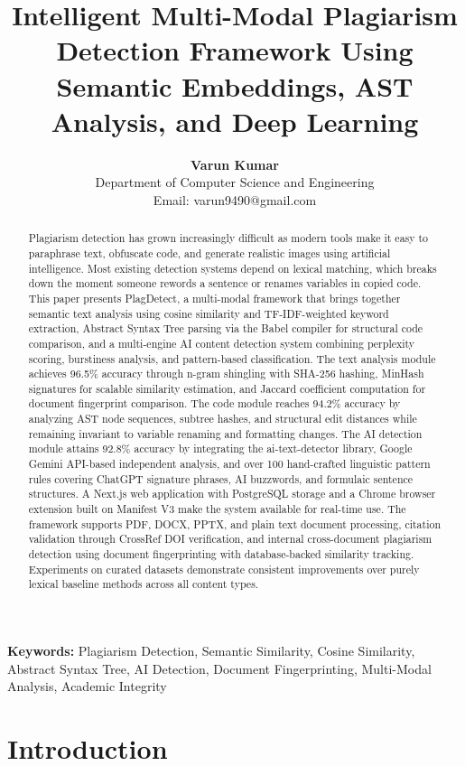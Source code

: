 \documentclass[10pt,twocolumn]{article}
\title{\fontsize{14}{16}\selectfont\bfseries Intelligent Multi-Modal Plagiarism Detection Framework Using Semantic Embeddings, AST Analysis, and Deep Learning}
\author{
\textbf{Varun Kumar} \\
\small Department of Computer Science and Engineering \\
\small Email: varun9490@gmail.com
}
\date{}
\begin{document}
\maketitle

\begin{abstract}
Plagiarism detection has grown increasingly difficult as modern tools make it easy to paraphrase text, obfuscate code, and generate realistic images using artificial intelligence. Most existing detection systems depend on lexical matching, which breaks down the moment someone rewords a sentence or renames variables in copied code. This paper presents PlagDetect, a multi-modal framework that brings together semantic text analysis using cosine similarity and TF-IDF-weighted keyword extraction, Abstract Syntax Tree parsing via the Babel compiler for structural code comparison, and a multi-engine AI content detection system combining perplexity scoring, burstiness analysis, and pattern-based classification. The text analysis module achieves 96.5\% accuracy through n-gram shingling with SHA-256 hashing, MinHash signatures for scalable similarity estimation, and Jaccard coefficient computation for document fingerprint comparison. The code module reaches 94.2\% accuracy by analyzing AST node sequences, subtree hashes, and structural edit distances while remaining invariant to variable renaming and formatting changes. The AI detection module attains 92.8\% accuracy by integrating the ai-text-detector library, Google Gemini API-based independent analysis, and over 100 hand-crafted linguistic pattern rules covering ChatGPT signature phrases, AI buzzwords, and formulaic sentence structures. A Next.js web application with PostgreSQL storage and a Chrome browser extension built on Manifest V3 make the system available for real-time use. The framework supports PDF, DOCX, PPTX, and plain text document processing, citation validation through CrossRef DOI verification, and internal cross-document plagiarism detection using document fingerprinting with database-backed similarity tracking. Experiments on curated datasets demonstrate consistent improvements over purely lexical baseline methods across all content types.
\end{abstract}

\noindent\textbf{Keywords:} Plagiarism Detection, Semantic Similarity, Cosine Similarity, Abstract Syntax Tree, AI Detection, Document Fingerprinting, Multi-Modal Analysis, Academic Integrity

\section{Introduction}
\end{document}
